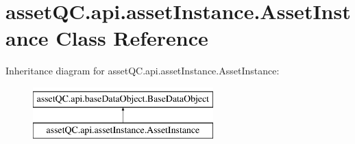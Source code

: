 \hypertarget{classassetQC_1_1api_1_1assetInstance_1_1AssetInstance}{\section{asset\-Q\-C.\-api.\-asset\-Instance.\-Asset\-Instance \-Class \-Reference}
\label{da/d1c/classassetQC_1_1api_1_1assetInstance_1_1AssetInstance}
}
\-Inheritance diagram for asset\-Q\-C.\-api.\-asset\-Instance.\-Asset\-Instance\-:\begin{figure}[H]
\begin{center}
\leavevmode
\includegraphics[height=2.000000cm]{da/d1c/classassetQC_1_1api_1_1assetInstance_1_1AssetInstance}
\end{center}
\end{figure}
